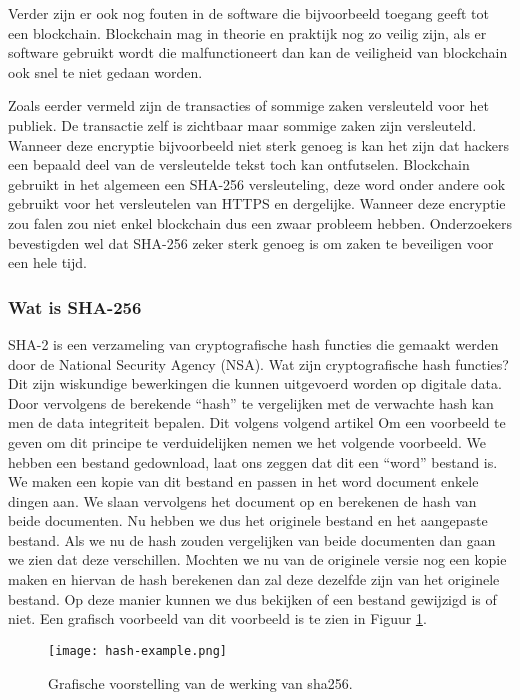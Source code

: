 Verder zijn er ook nog fouten in de software die bijvoorbeeld toegang geeft tot een blockchain. Blockchain mag in theorie en praktijk nog zo veilig zijn, als er software gebruikt wordt die malfunctioneert dan kan de veiligheid van blockchain ook snel te niet gedaan worden.

Zoals eerder vermeld zijn de transacties of sommige zaken versleuteld voor het publiek. De transactie zelf is zichtbaar maar sommige zaken zijn versleuteld. Wanneer deze encryptie bijvoorbeeld niet sterk genoeg is kan het zijn dat hackers een bepaald deel van de versleutelde tekst toch kan ontfutselen. Blockchain gebruikt in het algemeen een SHA-256 versleuteling, deze word onder andere ook gebruikt voor het versleutelen van HTTPS en dergelijke. Wanneer deze encryptie zou falen zou niet enkel blockchain dus een zwaar probleem hebben. Onderzoekers bevestigden wel dat SHA-256 zeker sterk genoeg is om zaken te beveiligen voor een hele tijd.

\subsubsection{Wat is SHA-256}
SHA-2 is een verzameling van cryptografische hash functies die gemaakt werden door de National Security Agency (NSA). Wat zijn cryptografische hash functies? Dit zijn wiskundige bewerkingen die kunnen uitgevoerd worden op digitale data. Door vervolgens de berekende ``hash'' te vergelijken met de verwachte hash kan men de data integriteit bepalen. Dit volgens volgend artikel \textcite{Wikipedia-Sha} Om een voorbeeld te geven om dit principe te verduidelijken nemen we het volgende voorbeeld. We hebben een bestand gedownload, laat ons zeggen dat dit een ``word'' bestand is. We maken een kopie van dit bestand en passen in het word document enkele dingen aan. We slaan vervolgens het document op en berekenen de hash van beide documenten. Nu hebben we dus het originele bestand en het aangepaste bestand. Als we nu de hash zouden vergelijken van beide documenten dan gaan we zien dat deze verschillen. Mochten we nu van de originele versie nog een kopie maken en hiervan de hash berekenen dan zal deze dezelfde zijn van het originele bestand. Op deze manier kunnen we dus bekijken of een bestand gewijzigd is of niet. Een grafisch voorbeeld van dit voorbeeld is te zien in Figuur \ref{fig:hash-example}.

 \begin{figure}
 	\texttt{[image: hash-example.png]}
 	\caption{Grafische voorstelling van de werking van sha256.}
 	\label{fig:hash-example}
 \end{figure}



